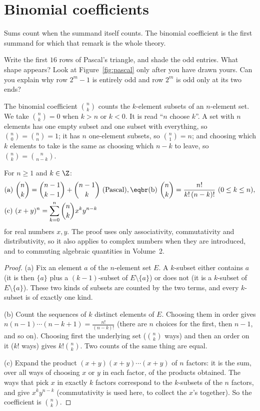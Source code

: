\section{Binomial coefficients}

Sums count when the summand itself counts. The binomial coefficient is the first summand for which that remark is the whole theory.

\begin{think}
Write the first $16$ rows of Pascal's triangle, and shade the odd entries. What shape appears? Look at Figure~\ref{fig:pascal} only after you have drawn yours. Can you explain why row $2^m-1$ is entirely odd and row $2^m$ is odd only at its two ends?
\end{think}

The binomial coefficient $\binom nk$ counts the $k$-element subsets of an $n$-element set. We take $\binom nk=0$ when $k>n$ or $k<0$. It is read ``$n$ choose $k$''.
A set with $n$ elements has one empty subset and one subset with everything, so $\binom n0=\binom nn=1$; it has $n$ one-element subsets, so
$\binom n1=n$; and choosing which $k$ elements to take is the same as choosing which $n-k$ to leave, so $\binom nk=\binom n{n-k}$.

\begin{proposition}\label{prop:binom}
For $n\ge1$ and $k\in\Z$:
\[
\begin{aligned}
&\text{(a)}\ \binom nk=\binom{n-1}{k-1}+\binom{n-1}{k}\ \text{(Pascal)},\eqbr
\text{(b)}\ \binom nk=\frac{n!}{k!\,(n-k)!}\ (0\le k\le n),\\
&\text{(c)}\ (x+y)^n=\sum_{k=0}^n\binom nk x^ky^{n-k}
\end{aligned}
\]
for real numbers $x,y$. The proof uses only associativity, commutativity and distributivity, so it also applies to complex numbers when they are introduced, and to commuting algebraic quantities in Volume~2.
\end{proposition}
\begin{proof}
(a) Fix an element $a$ of the $n$-element set $E$. A $k$-subset either contains $a$ (it is then $\{a\}$ plus a $(k-1)$-subset of $E\setminus\{a\}$) or does not (it is a $k$-subset of $E\setminus\{a\}$). These two kinds of subsets are counted by the two terms, and every $k$-subset is of exactly one kind.

(b) Count the sequences of $k$ distinct elements of $E$. Choosing them in order gives $n(n-1)\cdots(n-k+1)=\frac{n!}{(n-k)!}$ (there are $n$ choices for the first, then $n-1$, and so on). Choosing first the underlying set ($\binom nk$ ways) and then an order on it ($k!$ ways) gives $k!\binom nk$. Two counts of the same thing are equal.

(c) Expand the product $(x+y)(x+y)\cdots(x+y)$ of $n$ factors: it is the sum, over all ways of choosing $x$ or $y$ in each factor, of the products obtained. The ways that pick $x$ in exactly $k$ factors correspond to the $k$-subsets of the $n$ factors, and give $x^ky^{n-k}$ (commutativity is used here, to collect the $x$'s together). So the coefficient is $\binom nk$.
\end{proof}

